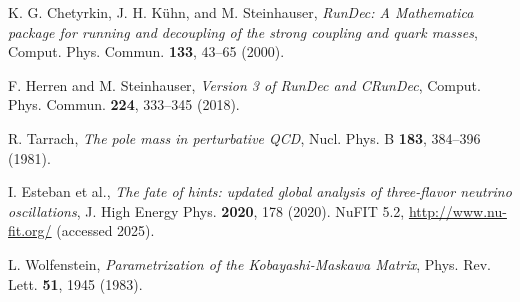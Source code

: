 \documentclass[%
amsmath,amssymb,
aps,
prb,
floatfix,showkeys
]{revtex4-2}
\begin{document}
\begin{thebibliography}{99}
K. G. Chetyrkin, J. H. Kühn, and M. Steinhauser,
{\it RunDec: A Mathematica package for running and decoupling of the strong coupling and quark masses},
Comput. Phys. Commun. {\bf 133}, 43--65 (2000).

F. Herren and M. Steinhauser,
{\it Version 3 of RunDec and CRunDec},
Comput. Phys. Commun. {\bf 224}, 333--345 (2018).

R. Tarrach,
{\it The pole mass in perturbative QCD},
Nucl. Phys. B {\bf 183}, 384--396 (1981).

I. Esteban et al.,
{\it The fate of hints: updated global analysis of three-flavor neutrino oscillations},
J. High Energy Phys. {\bf 2020}, 178 (2020).
NuFIT 5.2, \url{http://www.nu-fit.org/} (accessed 2025).

L. Wolfenstein,
{\it Parametrization of the Kobayashi-Maskawa Matrix},
Phys. Rev. Lett. {\bf 51}, 1945 (1983).

\end{thebibliography}
\end{document}
